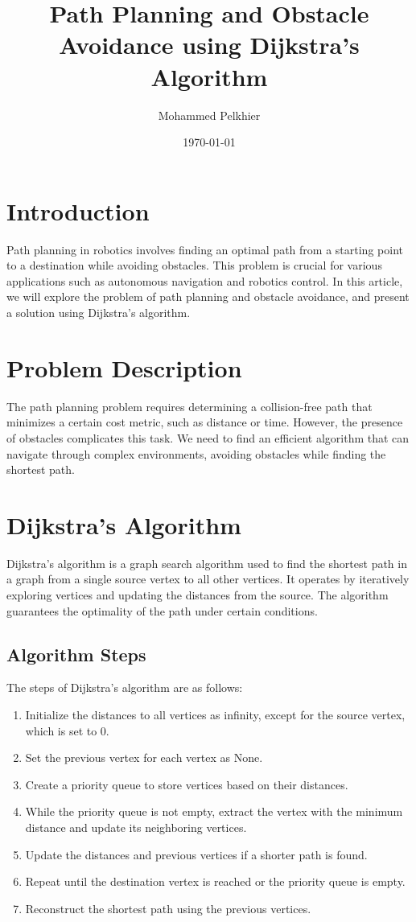 \documentclass{article}
\begin{document}
\title{Path Planning and Obstacle Avoidance using Dijkstra's Algorithm}
\author{Mohammed Pelkhier}
\date{\today}

\maketitle

\section{Introduction}
Path planning in robotics involves finding an optimal path from a starting point to a destination while avoiding obstacles. This problem is crucial for various applications such as autonomous navigation and robotics control. In this article, we will explore the problem of path planning and obstacle avoidance, and present a solution using Dijkstra's algorithm.

\section{Problem Description}
The path planning problem requires determining a collision-free path that minimizes a certain cost metric, such as distance or time. However, the presence of obstacles complicates this task. We need to find an efficient algorithm that can navigate through complex environments, avoiding obstacles while finding the shortest path.

\section{Dijkstra's Algorithm}
Dijkstra's algorithm is a graph search algorithm used to find the shortest path in a graph from a single source vertex to all other vertices. It operates by iteratively exploring vertices and updating the distances from the source. The algorithm guarantees the optimality of the path under certain conditions.

\subsection{Algorithm Steps}
The steps of Dijkstra's algorithm are as follows:

\begin{enumerate}
  \item Initialize the distances to all vertices as infinity, except for the source vertex, which is set to 0.
  \item Set the previous vertex for each vertex as None.
  \item Create a priority queue to store vertices based on their distances.
  \item While the priority queue is not empty, extract the vertex with the minimum distance and update its neighboring vertices.
  \item Update the distances and previous vertices if a shorter path is found.
  \item Repeat until the destination vertex is reached or the priority queue is empty.
  \item Reconstruct the shortest path using the previous vertices.
\end{enumerate}
\end{document}
